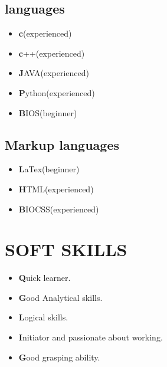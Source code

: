 \documentclass{article}
\begin{document}
\subsection{languages}
\begin{itemize}
 \item \textbf c(experienced)
\end{itemize}
\begin{itemize}
 \item \textbf c++(experienced)
\end{itemize}
\begin{itemize}
 \item \textbf JAVA(experienced)
\end{itemize}
\begin{itemize}
 \item \textbf Python(experienced)
\end{itemize}
\begin{itemize}
 \item \textbf BIOS(beginner)
\end{itemize}
\subsection{Markup languages}
\begin{itemize}
 \item \textbf LaTex(beginner)
\end{itemize}
\begin{itemize}
 \item \textbf HTML(experienced)
\end{itemize}
\begin{itemize}
 \item \textbf BIOCSS(experienced)
\end{itemize}
\section{SOFT SKILLS}
\begin{itemize}
 \item \textbf Quick learner.
\end{itemize}
\begin{itemize}
 \item \textbf Good Analytical skills.
\end{itemize}
\begin{itemize}
 \item \textbf Logical skills.
\end{itemize}
\begin{itemize}
 \item \textbf Initiator and passionate about working.
\end{itemize}
\begin{itemize}
 \item \textbf Good grasping ability.
\end{itemize}
\end{document}
